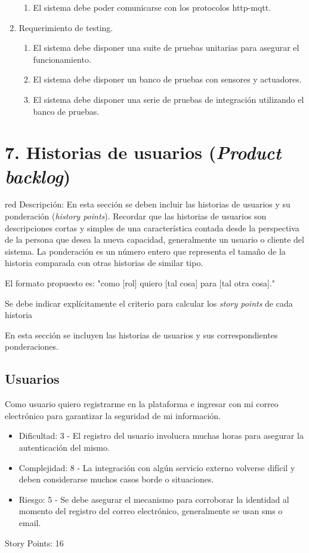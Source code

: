 \documentclass[
11pt, %
]{charter}
\begin{document}
\begin{enumerate}
\begin{enumerate}
			\item El sistema debe poder comunicarse con los protocolos http-mqtt.
		\end{enumerate}
	\item Requerimiento de testing.
		\begin{enumerate}
			\item El sistema debe disponer una suite de pruebas unitarias para asegurar el funcionamiento.
			\item El sistema debe disponer un banco de pruebas con sensores y actuadores.
			\item El sistema debe disponer una serie de pruebas de integración utilizando el banco de pruebas.
		\end{enumerate}
\end{enumerate}

\section{7. Historias de usuarios (\textit{Product backlog})}
\label{sec:backlog}

\begin{consigna}{red}
Descripción: En esta sección se deben incluir las historias de usuarios y su ponderación (\textit{history points}). Recordar que las historias de usuarios son descripciones cortas y simples de una característica contada desde la perspectiva de la persona que desea la nueva capacidad, generalmente un usuario o cliente del sistema. La ponderación es un número entero que representa el tamaño de la historia comparada con otras historias de similar tipo.

El formato propuesto es: "como [rol] quiero [tal cosa] para [tal otra cosa]."

Se debe indicar explícitamente el criterio para calcular los \textit{story points} de cada historia
\end{consigna}


En esta sección se incluyen las historias de usuarios y sus correspondientes ponderaciones.

\subsection{Usuarios}
Como usuario quiero registrarme en la plataforma e ingresar con mi correo electrónico para garantizar la seguridad de mi información.
\begin{itemize}
	\item Dificultad: 3 - El registro del usuario involucra muchas horas para asegurar la autenticación del mismo.
	\item Complejidad: 8 - La integración con algún servicio externo volverse difícil y deben considerarse muchos casos borde o situaciones.
	\item Riesgo: 5 - Se debe asegurar el mecanismo para corroborar la identidad al momento del registro del correo electrónico, generalmente se usan sms o email.
\end{itemize}
Story Points: 16
\end{document}
